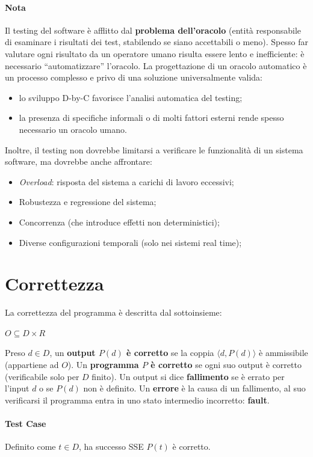 \paragraph{Nota} Il testing del software è afflitto dal \textbf{problema dell'oracolo} (entità responsabile di esaminare i risultati dei test, stabilendo se siano accettabili o meno). Spesso far valutare ogni risultato da un operatore umano risulta essere lento e inefficiente: è necessario “automatizzare” l'oracolo. La progettazione di un oracolo automatico è un processo complesso e privo di una soluzione universalmente valida:
\begin{itemize}
    \item lo sviluppo D-by-C favorisce l'analisi automatica del testing; 
    \item la presenza di specifiche informali o di molti fattori esterni rende spesso necessario un oracolo umano.
\end{itemize}
Inoltre, il testing non dovrebbe limitarsi a verificare le funzionalità di un sistema software, ma dovrebbe anche affrontare:
\begin{itemize}
\item \textit{Overload}: risposta del sistema a carichi di lavoro eccessivi;
\item Robustezza e regressione del sistema;
\item Concorrenza (che introduce effetti non deterministici);
\item Diverse configurazioni temporali (solo nei sistemi real time);
\end{itemize}

\section{Correttezza}

La correttezza del programma è descritta dal sottoinsieme:
\begin{center}
$O \subseteq D \times R$    
\end{center}
Preso $d \in D$, un \textbf{output $P(d)$ è corretto} se la coppia $\langle d, P(d) \rangle$ è ammissibile (appartiene ad $O$). Un \textbf{programma $P$ è corretto} se ogni suo output è corretto (verificabile solo per $D$ finito). Un output si dice \textbf{fallimento} se è errato per l'input $d$ o se $P(d)$ non è definito. Un \textbf{errore} è la causa di un fallimento, al suo verificarsi il programma entra in uno stato intermedio incorretto: \textbf{fault}.

\paragraph{Test Case} Definito come $t \in D$, ha successo SSE $P(t)$ è corretto.

